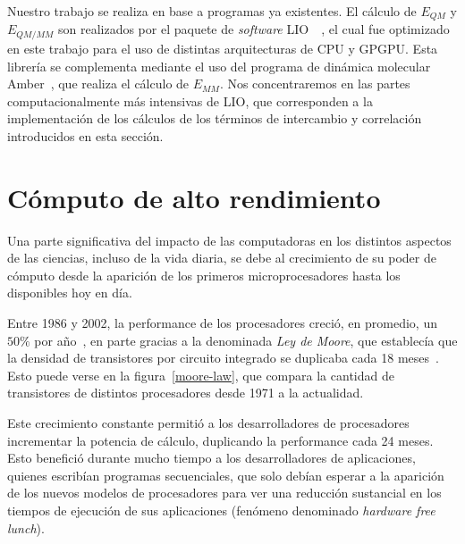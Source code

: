Nuestro trabajo se realiza en base a programas ya existentes. El c\'alculo de $E_{QM}$ y $E_{QM/MM}$ son realizados por el paquete de
\textit{software} LIO~\cite{LIO}~\cite{TesisNitsche}, el cual fue optimizado en este trabajo para el uso de
distintas arquitecturas de CPU y GPGPU. Esta librer\'ia
se complementa mediante el uso del programa de din\'amica molecular Amber~\cite{Amber}, que realiza el c\'alculo
de $E_{MM}$. Nos concentraremos en las partes computacionalmente m\'as intensivas de LIO, que corresponden a la
implementaci\'on de los c\'alculos de los t\'erminos de intercambio y correlaci\'on introducidos en esta secci\'on.

\section{C\'omputo de alto rendimiento}

Una parte significativa del impacto de las computadoras en los distintos aspectos de las ciencias, incluso de la vida diaria, se debe al crecimiento de su poder de c\'omputo desde la aparici\'on de los primeros microprocesadores hasta los disponibles hoy en d\'ia.

Entre 1986 y 2002, la performance de los procesadores creci\'o, en promedio, un $50\%$ por a\~no~\cite{Pacheco}, en parte gracias a la denominada \textit{Ley de Moore}, que
establec\'ia que la densidad de transistores por circuito integrado se duplicaba cada 18 meses~\cite{HennessyPatterson}.
Esto puede verse en la figura~\ref{moore-law}, que compara la cantidad de transistores de distintos procesadores desde 1971 a la actualidad.

Este crecimiento constante permiti\'o a los desarrolladores de procesadores incrementar la potencia de c\'alculo, duplicando la performance cada 24 meses.
Esto benefici\'o durante mucho tiempo a los desarrolladores de aplicaciones, quienes escrib\'ian programas secuenciales, que solo deb\'ian esperar a la aparici\'on de los nuevos modelos de procesadores para ver una reducci\'on sustancial en los tiempos de ejecuci\'on de sus aplicaciones (fen\'omeno denominado \textit{hardware free lunch}).

